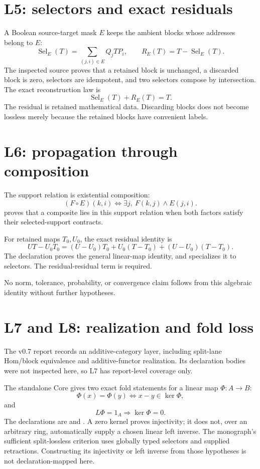 \documentclass[11pt]{article}
\begin{document}
\section{L5: selectors and exact residuals}
A Boolean source-target mask \(E\) keeps the ambient blocks whose addresses
belong to \(E\):
\[
 \operatorname{Sel}_E(T)=\sum_{(j,i)\in E}Q_jTP_i,
 \qquad R_E(T)=T-\operatorname{Sel}_E(T).
\]
The inspected source proves that a retained block is unchanged, a discarded
block is zero, selectors are idempotent, and two selectors compose by
intersection. The exact reconstruction law is
\[
 \operatorname{Sel}_E(T)+R_E(T)=T.
\]
The residual is retained mathematical data. Discarding blocks does not become
lossless merely because the retained blocks have convenient labels.

\section{L6: propagation through composition}
The support relation \texttt{} is existential composition:
\[
 (F\circ E)(k,i)\iff\exists j,\ F(k,j)\land E(j,i).
\]
\texttt{} proves that a composite lies in this
support relation when both factors satisfy their selected-support contracts.

For retained maps \(T_0,U_0\), the exact residual identity is
\[
 UT-U_0T_0=(U-U_0)T_0+U_0(T-T_0)+(U-U_0)(T-T_0).
\]
The declaration \texttt{} proves the general
linear-map identity, and \texttt{}
specializes it to selectors. The residual-residual term is required.

No norm, tolerance, probability, or convergence claim follows from this
algebraic identity without further hypotheses.

\section{L7 and L8: realization and fold loss}
The v0.7 report records an additive-category layer, including split-lane
Hom/block equivalence and additive-functor realization. Its declaration
bodies were not inspected here, so L7 has report-level coverage only.

The standalone Core gives two exact fold statements for a linear map
\(\Phi:A\to B\):
\[
 \Phi(x)=\Phi(y)\iff x-y\in\ker\Phi,
\]
and
\[
 L\Phi=1_A\Longrightarrow\ker\Phi=0.
\]
The declarations are \texttt{} and
\texttt{}. A zero kernel proves injectivity;
it does not, over an arbitrary ring, automatically supply a chosen linear
left inverse. The monograph's sufficient split-lossless criterion uses globally typed
selectors and supplied retractions. Constructing its injectivity or left
inverse from those hypotheses is not declaration-mapped here.
\end{document}
